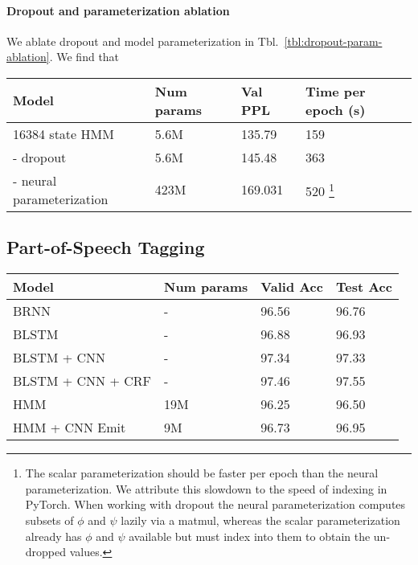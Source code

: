 \documentclass[11pt,a4paper]{article}
\begin{document}
\paragraph{Dropout and parameterization ablation}
We ablate dropout and model parameterization in Tbl.~\ref{tbl:dropout-param-ablation}.
We find that 

\begin{table*}[!t]
\centering
\begin{tabular}{llll}
\toprule
Model                           & Num params & Val PPL & Time per epoch (s)\\
\midrule
16384 state HMM                 & 5.6M    & 135.79  & 159\\
\quad - dropout                 & 5.6M    & 145.48  & 363\\
\quad - neural parameterization & 423M    & 169.031 & 520
\footnote{The scalar parameterization should be faster per epoch than the
neural parameterization. We attribute this slowdown
to the speed of indexing in PyTorch.
When working with dropout
the neural parameterization computes subsets
of $\phi$ and $\psi$ lazily via a matmul,
whereas the scalar parameterization already has $\phi$ and $\psi$
available but must index into them to obtain the
un-dropped values.}\\
\bottomrule
\end{tabular}
\caption{\label{tbl:dropout-param-ablation}
Perplexities on the \texttt{Penn Treebank} dataset.
Dropout and parameterization ablation
}
\end{table*}

\subsection{Part-of-Speech Tagging}

\begin{table*}[!t]
\centering
\begin{tabular}{llll}
\toprule
Model                               & Num params & Valid Acc & Test Acc\\
\midrule
BRNN \citep{ma2016crf}              & -          & 96.56     & 96.76    \\ 
BLSTM \citep{ma2016crf}             & -          & 96.88     & 96.93    \\ 
BLSTM + CNN \citep{ma2016crf}       & -          & 97.34     & 97.33    \\ 
BLSTM + CNN + CRF \citep{ma2016crf} & -          & 97.46     & 97.55    \\ 
\midrule
HMM                                 & 19M        & 96.25     & 96.50    \\
HMM + CNN Emit                      & 9M         & 96.73     & 96.95    \\
\bottomrule
\end{tabular}
\caption{\label{tbl:pos}
Tagging accuracies on the Wall Street Journal (WSJ) portion of the
\texttt{Penn Treebank}.
}
\end{table*}
\end{document}
